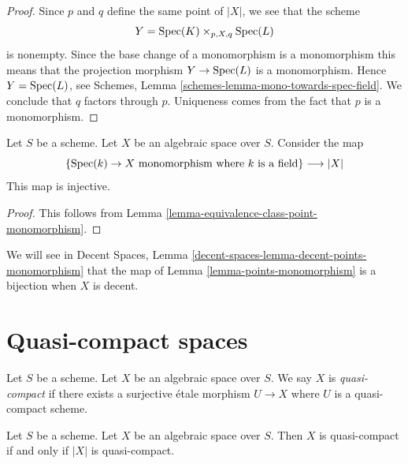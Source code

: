 \begin{proof}
Since $p$ and $q$ define the same point of $|X|$, we see that the scheme
$$
Y = \mathop{\mathrm{Spec}}(K) \times_{p, X, q} \mathop{\mathrm{Spec}}(L)
$$
is nonempty. Since the base change of a monomorphism is a monomorphism
this means that the projection morphism $Y \to \mathop{\mathrm{Spec}}(L)$
is a monomorphism. Hence $Y = \mathop{\mathrm{Spec}}(L)$, see
Schemes, Lemma \ref{schemes-lemma-mono-towards-spec-field}.
We conclude that $q$ factors through $p$. Uniqueness
comes from the fact that $p$ is a monomorphism.
\end{proof}

\begin{lemma}
\label{lemma-points-monomorphism}
Let $S$ be a scheme. Let $X$ be an algebraic space over $S$.
Consider the map
$$
\{\mathop{\mathrm{Spec}}(k) \to X \text{ monomorphism where }k\text{ is a field}\}
\longrightarrow
|X|
$$
This map is injective.
\end{lemma}

\begin{proof}
This follows from Lemma \ref{lemma-equivalence-class-point-monomorphism}.
\end{proof}

\noindent
We will see in Decent Spaces,
Lemma \ref{decent-spaces-lemma-decent-points-monomorphism}
that the map of Lemma \ref{lemma-points-monomorphism}
is a bijection when $X$ is decent.

















\section{Quasi-compact spaces}
\label{section-quasi-compact}

\begin{definition}
\label{definition-quasi-compact}
Let $S$ be a scheme.
Let $X$ be an algebraic space over $S$.
We say $X$ is {\it quasi-compact} if there exists a surjective
\'etale morphism $U \to X$ where $U$ is a quasi-compact scheme.
\end{definition}

\begin{lemma}
\label{lemma-quasi-compact-space}
Let $S$ be a scheme.
Let $X$ be an algebraic space over $S$.
Then $X$ is quasi-compact if and only if $|X|$ is quasi-compact.
\end{lemma}

